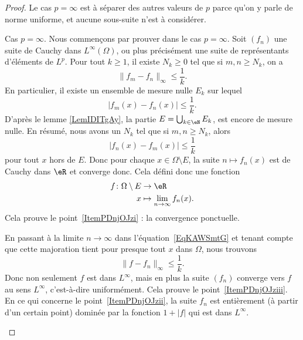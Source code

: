 \begin{proof}
    Le cas \( p=\infty\) est à séparer des autres valeurs de \( p\) parce qu'on y parle de norme uniforme, et aucune sous-suite n'est à considérer.
    \begin{subproof}
    \item[Cas \( p=\infty\).]
    Nous commençons par prouver dans le cas \( p=\infty\). Soit \( (f_n)\) une suite de Cauchy dans \( L^{\infty}(\Omega)\), ou plus précisément une suite de représentants d'éléments de \( L^p\). Pour tout \( k\geq 1\), il existe \( N_k\geq 0\) tel que si \( m,n\geq N_k\), on a
    \begin{equation}
        \| f_m-f_n \|_{\infty}\leq \frac{1}{ k }.
    \end{equation}
    En particulier, il existe un ensemble de mesure nulle \( E_k\) sur lequel
    \begin{equation}
        | f_m(x)-f_n(x) |\leq\frac{1}{ k }.
    \end{equation}
    D'après le lemme \ref{LemIDITgAy}, la partie \( E=\bigcup_{k\in \eN}E_k\), est encore de mesure nulle. En  résumé, nous avons un \( N_k\) tel que si \( m,n\geq N_k\), alors
    \begin{equation}    \label{EqKAWSmtG}
        | f_n(x)-f_m(x) |\leq \frac{1}{ k }
    \end{equation}
    pour tout \( x\) hors de \( E\). Donc pour chaque \( x\in\Omega\setminus E\), la suite \( n\mapsto f_n(x)\) est de Cauchy dans \( \eR\) et converge donc. Cela défini donc une fonction
    \begin{equation}
        \begin{aligned}
            f\colon \Omega\setminus E&\to \eR \\
            x&\mapsto \lim_{n\to \infty} f_n(x).
        \end{aligned}
    \end{equation}
    Cela prouve le point~\ref{ItemPDnjOJzi} : la convergence ponctuelle.

    En passant à la limite \( n\to \infty\) dans l'équation~\eqref{EqKAWSmtG} et tenant compte que cette majoration tient pour presque tout \( x\) dans \( \Omega\), nous trouvons
    \begin{equation}
        \| f-f_n \|_{\infty}\leq \frac{1}{ k }.
    \end{equation}
    Donc non seulement \( f\) est dans \( L^{\infty}\), mais en plus la suite \( (f_n)\) converge vers \( f\) au sens \( L^{\infty}\), c'est-à-dire uniformément. Cela prouve le point~\ref{ItemPDnjOJziii}. En ce qui concerne le point~\ref{ItemPDnjOJzii}, la suite \( f_n\) est entièrement (à partir d'un certain point) dominée par la fonction \( 1+| f |\) qui est dans \( L^{\infty}\).


\end{subproof}
\end{proof}
